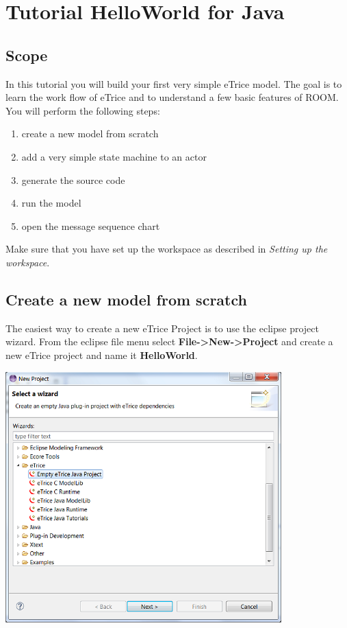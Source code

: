 \chapter{Tutorial HelloWorld for Java}

\section{Scope}

In this tutorial you will build your first very simple eTrice model. The goal is to learn the work flow of 
eTrice and to understand a few basic features of ROOM. You will perform the following steps:

\begin{enumerate}
\item create a new model from scratch
\item add a very simple state machine to an actor
\item generate the source code
\item run the model
\item open the message sequence chart
\end{enumerate}

Make sure that you have set up the workspace as described in \textit{Setting up the workspace}.

\section{Create a new model from scratch}

The easiest way to create a new eTrice Project is to use the eclipse project wizard. From the eclipse file 
menu select \textbf{File->New->Project} and create a new eTrice project and name it \textbf{HelloWorld}.

\includegraphics[width=0.8\textwidth]{images/015-HelloWorld10.png}

